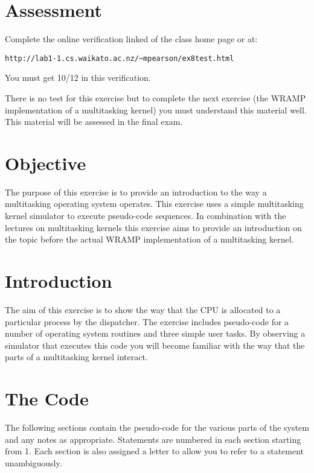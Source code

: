 \documentclass[a4paper,10pt]{article}
\begin{document}

\section{Assessment}

Complete the online verification linked of the class home page or
at:
\begin{center}\verb+http://lab1-1.cs.waikato.ac.nz/~mpearson/ex8test.html+\\
\end{center}
You must get 10/12 in this verification.

There is no test for this exercise but to complete the next exercise
(the WRAMP implementation of a multitasking kernel) you must
understand this material well.  This material will be assessed in the
final exam.

\section{Objective}

The purpose of this exercise is to provide an introduction to the way
a multitasking operating system operates. This exercise uses a simple
multitasking kernel simulator to execute pseudo-code sequences. In
combination with the lectures on multitasking kernels this exercise
aims to provide an introduction on the topic before the actual WRAMP
implementation of a multitasking kernel.

\section{Introduction} 

The aim of this exercise is to show the way that the CPU is
allocated to a particular process by the dispatcher. The exercise
includes pseudo-code for a number of operating system routines and
three simple user tasks.  By observing a simulator that
executes this code you will become familiar with the way that the
parts of a multitasking kernel interact.

\section{The Code}
The following sections contain the pseudo-code for the various parts
of the system and any notes as appropriate. Statements are numbered in
each section starting from 1.  Each section is also assigned a letter
to allow you to refer to a statement unambiguously.  
\end{document}

